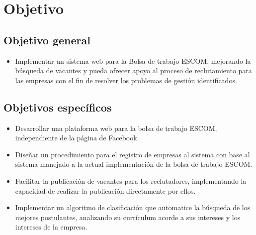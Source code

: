 \section{Objetivo}
\subsection{Objetivo general}
\begin{itemize}
    \item Implementar un sistema web para la Bolsa de trabajo ESCOM, mejorando la búsqueda de vacantes y pueda 
    ofrecer apoyo al proceso de reclutamiento para las empresas con el fin de resolver los problemas de gestión 
    identificados.
\end{itemize}

\subsection{Objetivos específicos}
        \begin{itemize}
            \item Desarrollar una plataforma web para la bolsa de trabajo ESCOM, independiente de la página de Facebook.
            \item Diseñar un procedimiento para el registro de empresas al sistema con base al sistema manejado a la actual 
            implementación de la bolsa de trabajo ESCOM.

            \item Facilitar la publicación de vacantes para los reclutadores, implementando la capacidad de realizar la
            publicación directamente por ellos.
            \item Implementar un algoritmo de clasificación que automatice la búsqueda de los mejores postulantes, analizando su 
            currículum acorde a sus intereses y los intereses de la empresa.

        \end{itemize}


        
